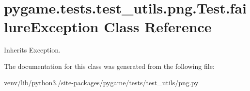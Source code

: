 \hypertarget{classpygame_1_1tests_1_1test__utils_1_1png_1_1_test_1_1failure_exception}{}\section{pygame.\+tests.\+test\+\_\+utils.\+png.\+Test.\+failure\+Exception Class Reference}
\label{classpygame_1_1tests_1_1test__utils_1_1png_1_1_test_1_1failure_exception}


Inherits Exception.



The documentation for this class was generated from the following file\+:\begin{DoxyCompactItemize}
\item 
venv/lib/python3./site-\/packages/pygame/tests/test\+\_\+utils/png.\+py\end{DoxyCompactItemize}
